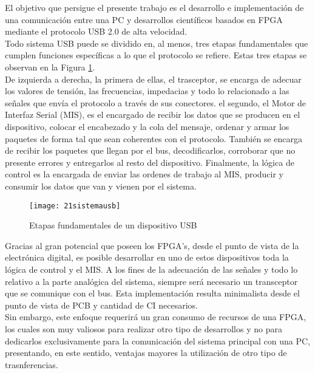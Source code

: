 El objetivo que persigue el presente trabajo es el desarrollo e implementación de una comunicación entre una PC y desarrollos científicos basados en FPGA mediante el protocolo USB 2.0 de alta velocidad.\\

Todo sistema USB puede se dividido en, al menos, tres etapas fundamentales que cumplen funciones específicas a lo que el protocolo se refiere. Estas tres etapas se observan en la Figura \ref{usbDeviceScheme}.\\

De izquierda a derecha, la primera de ellas, el trasceptor, se encarga de adecuar los valores de tensión, las frecuencias, impedacias y todo lo relacionado a las señales que envía el protocolo a través de sus conectores. el segundo, el Motor de Interfaz Serial (MIS), es el encargado de recibir los datos que se producen en el dispositivo, colocar el encabezado y la cola del mensaje, ordenar y armar los paquetes de forma tal que sean coherentes con el protocolo. También se encarga de recibir los paquetes que llegan por el bus, decodificarlos, corroborar que no presente errores y entregarlos al resto del dispositivo. Finalmente, la lógica de control es la encargada de enviar las ordenes de trabajo al MIS, producir y consumir los datos que van y vienen por el sistema.\\

\begin{figure}
	\centering
	\texttt{[image: 21sistemausb]}
	\caption{Etapas fundamentales de un dispositivo USB}
	\label{usbDeviceScheme}
\end{figure}

Gracias al gran potencial que poseen los FPGA's, desde el punto de vista de la electrónica digital, es posible desarrollar en uno de estos dispositivos toda la lógica de control y el MIS. A los fines de la adecuación de las señales y todo lo relativo a la parte analógica del sistema, siempre será necesario un transceptor que se comunique con el bus. Esta implementación resulta minimalista desde el punto de vista de PCB y cantidad de CI necesarios.\\

Sin embargo, este enfoque requerirá un gran consumo de recursos de una FPGA, los cuales son muy valiosos para realizar otro tipo de desarrollos y no para dedicarlos exclusivamente para la comunicación del sistema principal con una PC, presentando, en este sentido, ventajas mayores la utilización de otro tipo de trasnferencias.\\

